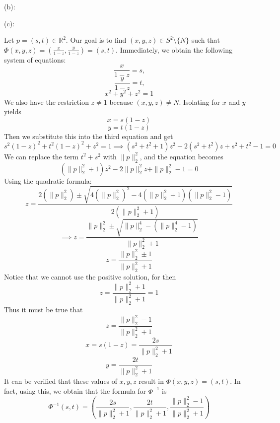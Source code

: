 \documentclass{article}
\theoremstyle{plain} %
\numberwithin{thm}{section} %
\theoremstyle{definition}
\begin{document}
\begin{question}{23}
        (b):

        (c):

        Let \(p = (s,t) \in \mathbb{R}^2\). Our goal is to find \((x,y,z) \in S^2 \setminus \{N\}\) such that \(\Phi (x,y,z) = \left( \frac{x}{1-z}, \frac{y}{1-z} \right) = (s,t)\). Immediately, we obtain the following system of equations:
        \[
            \frac{x}{1-z} = s \text{,} 
        \]
        \[
            \frac{y}{1-z} = t \text{,} 
        \]
        \[
            x^2 + y^2 + z^2 = 1
        \]
        We also have the restriction \(z\neq 1\) because \((x,y,z) \neq N\). Isolating for \(x\) and \(y\) yields
        \[
            x=s(1-z)
        \]
        \[
            y=t(1-z)
        \]
        Then we substitute this into the third equation and get
        \[
            s^2(1-z)^2 + t^2(1-z)^2 + z^2 = 1 \implies (s^2 + t^2 + 1)z^2 - 2(s^2 + t^2)z + s^2 + t^2 - 1 = 0
        \]
        We can replace the term \(t^2 + s^2\) with \(\|p\| _2 ^2\), and the equation becomes
        \[
            (\|p\| _2 ^2 + 1)z^2 - 2\|p\| _2 ^2 z + \|p\| _2 ^2 - 1 = 0
        \]
        Using the quadratic formula:
        \[
            z = \frac{2(\|p\| _2 ^2) \pm \sqrt{4(\|p\| _2 ^2)^2 - 4(\|p\| _2 ^2 +1)(\|p\| _2 ^2 - 1)}}{2(\|p\| _2 ^2 + 1)}
        \]
        \[
            \implies z = \frac{\|p\| _2 ^2 \pm \sqrt{\|p\| _2 ^4 - (\|p\| _2 ^4 - 1)}}{\|p\| _2 ^2 + 1}
        \]
        \[
            z = \frac{\|p\| _2 ^2 \pm 1}{\|p\| _2 ^2 + 1}
        \]
        Notice that we cannot use the positive solution, for then
        \[
            z = \frac{\|p\| _2 ^2 + 1}{\|p\| _2 ^2 + 1} = 1
        \]
        Thus it must be true that
        \[
            z = \frac{\|p\| _2 ^2 - 1}{\|p\| _2 ^2 + 1}
        \]
        \[
            x = s(1-z) = \frac{2s}{\|p\| _2 ^2 + 1}
        \]
        \[
            y = \frac{2t}{\|p\| _2 ^2 + 1}
        \]
        It can be verified that these values of \(x,y,z\) result in \(\Phi (x,y,z) = (s,t)\). In fact, using this, we obtain that the formula for \(\Phi ^{-1}\) is
        \[
            \Phi ^{-1} (s,t) = \left(\frac{2s}{\|p\| _2 ^2 + 1}, \frac{2t}{\|p\| _2 ^2 + 1}, \frac{\|p\| _2 ^2 - 1}{\|p\| _2 ^2 + 1}\right) 
        \]
    \end{question}
    \pagebreak
\end{document}
